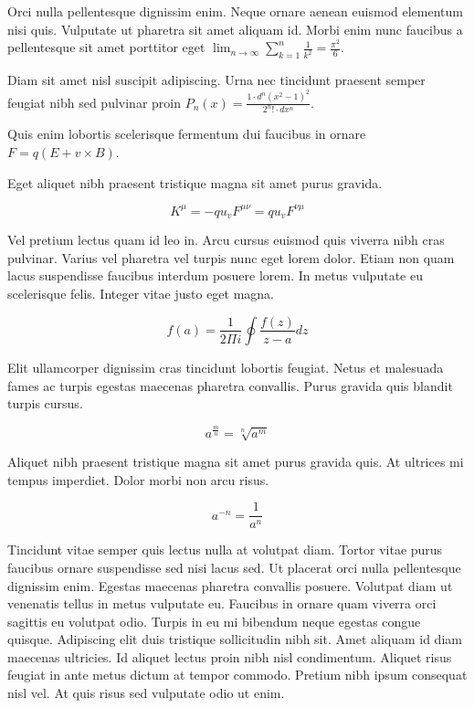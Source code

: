 \documentclass{article}
\begin{document}
	
    Orci nulla pellentesque dignissim enim. Neque ornare aenean euismod elementum nisi quis. Vulputate ut pharetra sit amet aliquam id. Morbi enim nunc faucibus a pellentesque sit amet porttitor eget  \begin{math}
    	\lim_{n \to \infty}\sum_{k=1}^n \frac{1}{k^2}= \frac{\pi^2}{6}
    \end{math}.
    \newline
    
   Diam sit amet nisl suscipit adipiscing. Urna nec tincidunt praesent semper feugiat nibh sed pulvinar proin $ P_n\left ( x \right ) = \frac{1 \cdot d^n\left ( x^2-1 \right )^2}{2^n ! \cdot dx^n} $.
   \newline
    
    Quis enim lobortis scelerisque fermentum dui faucibus in ornare \( F=q\left ( E+v \times B \right ) \).
    \newline
    
    Eget aliquet nibh praesent tristique magna sit amet purus gravida.
    
    \[ K^\mu =-qu_vF^{\mu \nu }=qu_vF^{\nu \mu }  \]
    
    Vel pretium lectus quam id leo in. Arcu cursus euismod quis viverra nibh cras pulvinar. Varius vel pharetra vel turpis nunc eget lorem dolor. Etiam non quam lacus suspendisse faucibus interdum posuere lorem. In metus vulputate eu scelerisque felis. Integer vitae justo eget magna.
    
    $$ f\left ( a \right ) = \frac{1}{2\Pi i} \oint \frac{f\left ( z \right )}{z-a} dz $$
    
    Elit ullamcorper dignissim cras tincidunt lobortis feugiat. Netus et malesuada fames ac turpis egestas maecenas pharetra convallis. Purus gravida quis blandit turpis cursus. 
    
    \begin{displaymath}
    	a^{\frac{m}{n}}=\sqrt[n]{a^{m}}
    \end{displaymath}
    
    Aliquet nibh praesent tristique magna sit amet purus gravida quis. At ultrices mi tempus imperdiet. Dolor morbi non arcu risus.
    
    \begin{equation}
    	a^{-n}=\frac{1}{a^{n}}
    \end{equation}
    
    Tincidunt vitae semper quis lectus nulla at volutpat diam. Tortor vitae purus faucibus ornare suspendisse sed nisi lacus sed. Ut placerat orci nulla pellentesque dignissim enim. Egestas maecenas pharetra convallis posuere. Volutpat diam ut venenatis tellus in metus vulputate eu. Faucibus in ornare quam viverra orci sagittis eu volutpat odio. Turpis in eu mi bibendum neque egestas congue quisque. Adipiscing elit duis tristique sollicitudin nibh sit. Amet aliquam id diam maecenas ultricies. Id aliquet lectus proin nibh nisl condimentum. Aliquet risus feugiat in ante metus dictum at tempor commodo. Pretium nibh ipsum consequat nisl vel. At quis risus sed vulputate odio ut enim.
    
\end{document}
